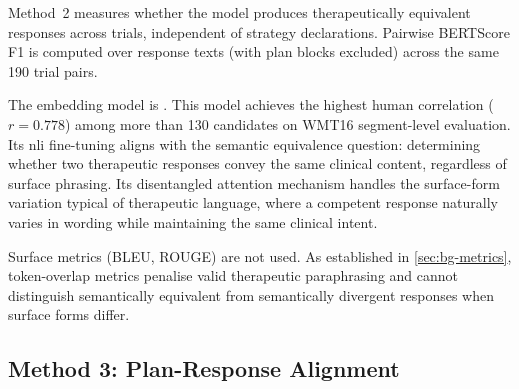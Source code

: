 Method~2 measures whether the model produces therapeutically equivalent
responses across trials, independent of strategy declarations. Pairwise
BERTScore F1 is computed over response texts (with plan blocks excluded)
across the same 190 trial pairs.

The embedding model is  \parencite{8MQC2H2V}. This model
achieves the highest human correlation ($r = 0.778$) among more than 130
candidates on WMT16 segment-level evaluation. Its \gls{nli} fine-tuning
aligns with the semantic equivalence question: determining whether two
therapeutic responses convey the same clinical content, regardless of
surface phrasing. Its disentangled attention mechanism handles the
surface-form variation typical of therapeutic language, where a competent
response naturally varies in wording while maintaining the same clinical
intent.

Surface metrics (BLEU, ROUGE) are not used. As established in
\autoref{sec:bg-metrics}, token-overlap metrics penalise valid therapeutic
paraphrasing and cannot distinguish semantically equivalent from
semantically divergent responses when surface forms differ.


\subsection{Method 3: Plan-Response Alignment}
\label{sec:meth-m3}
%

